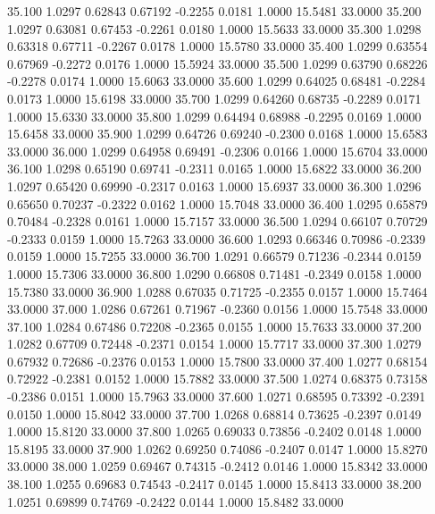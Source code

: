   35.100   1.0297   0.62843   0.67192  -0.2255   0.0181   1.0000  15.5481  33.0000
  35.200   1.0297   0.63081   0.67453  -0.2261   0.0180   1.0000  15.5633  33.0000
  35.300   1.0298   0.63318   0.67711  -0.2267   0.0178   1.0000  15.5780  33.0000
  35.400   1.0299   0.63554   0.67969  -0.2272   0.0176   1.0000  15.5924  33.0000
  35.500   1.0299   0.63790   0.68226  -0.2278   0.0174   1.0000  15.6063  33.0000
  35.600   1.0299   0.64025   0.68481  -0.2284   0.0173   1.0000  15.6198  33.0000
  35.700   1.0299   0.64260   0.68735  -0.2289   0.0171   1.0000  15.6330  33.0000
  35.800   1.0299   0.64494   0.68988  -0.2295   0.0169   1.0000  15.6458  33.0000
  35.900   1.0299   0.64726   0.69240  -0.2300   0.0168   1.0000  15.6583  33.0000
  36.000   1.0299   0.64958   0.69491  -0.2306   0.0166   1.0000  15.6704  33.0000
  36.100   1.0298   0.65190   0.69741  -0.2311   0.0165   1.0000  15.6822  33.0000
  36.200   1.0297   0.65420   0.69990  -0.2317   0.0163   1.0000  15.6937  33.0000
  36.300   1.0296   0.65650   0.70237  -0.2322   0.0162   1.0000  15.7048  33.0000
  36.400   1.0295   0.65879   0.70484  -0.2328   0.0161   1.0000  15.7157  33.0000
  36.500   1.0294   0.66107   0.70729  -0.2333   0.0159   1.0000  15.7263  33.0000
  36.600   1.0293   0.66346   0.70986  -0.2339   0.0159   1.0000  15.7255  33.0000
  36.700   1.0291   0.66579   0.71236  -0.2344   0.0159   1.0000  15.7306  33.0000
  36.800   1.0290   0.66808   0.71481  -0.2349   0.0158   1.0000  15.7380  33.0000
  36.900   1.0288   0.67035   0.71725  -0.2355   0.0157   1.0000  15.7464  33.0000
  37.000   1.0286   0.67261   0.71967  -0.2360   0.0156   1.0000  15.7548  33.0000
  37.100   1.0284   0.67486   0.72208  -0.2365   0.0155   1.0000  15.7633  33.0000
  37.200   1.0282   0.67709   0.72448  -0.2371   0.0154   1.0000  15.7717  33.0000
  37.300   1.0279   0.67932   0.72686  -0.2376   0.0153   1.0000  15.7800  33.0000
  37.400   1.0277   0.68154   0.72922  -0.2381   0.0152   1.0000  15.7882  33.0000
  37.500   1.0274   0.68375   0.73158  -0.2386   0.0151   1.0000  15.7963  33.0000
  37.600   1.0271   0.68595   0.73392  -0.2391   0.0150   1.0000  15.8042  33.0000
  37.700   1.0268   0.68814   0.73625  -0.2397   0.0149   1.0000  15.8120  33.0000
  37.800   1.0265   0.69033   0.73856  -0.2402   0.0148   1.0000  15.8195  33.0000
  37.900   1.0262   0.69250   0.74086  -0.2407   0.0147   1.0000  15.8270  33.0000
  38.000   1.0259   0.69467   0.74315  -0.2412   0.0146   1.0000  15.8342  33.0000
  38.100   1.0255   0.69683   0.74543  -0.2417   0.0145   1.0000  15.8413  33.0000
  38.200   1.0251   0.69899   0.74769  -0.2422   0.0144   1.0000  15.8482  33.0000
